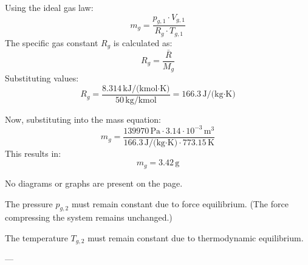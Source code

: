 Using the ideal gas law:  
\[
m_g = \frac{p_{g,1} \cdot V_{g,1}}{R_g \cdot T_{g,1}}
\]  
The specific gas constant \( R_g \) is calculated as:  
\[
R_g = \frac{\bar{R}}{M_g}
\]  
Substituting values:  
\[
R_g = \frac{8.314 \, \text{kJ/(kmol·K)}}{50 \, \text{kg/kmol}} = 166.3 \, \text{J/(kg·K)}
\]  

Now, substituting into the mass equation:  
\[
m_g = \frac{139970 \, \text{Pa} \cdot 3.14 \cdot 10^{-3} \, \text{m}^3}{166.3 \, \text{J/(kg·K)} \cdot 773.15 \, \text{K}}
\]  
This results in:  
\[
m_g = 3.42 \, \text{g}
\]  

No diagrams or graphs are present on the page.

The pressure \( p_{g,2} \) must remain constant due to force equilibrium.  
(The force compressing the system remains unchanged.)  

The temperature \( T_{g,2} \) must remain constant due to thermodynamic equilibrium.  

---